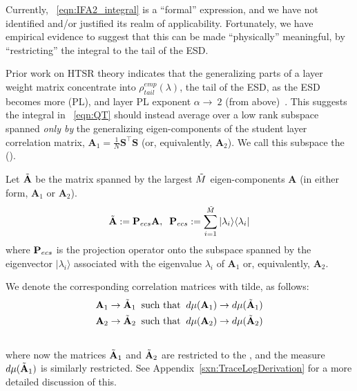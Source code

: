 Currently, \EQN~\ref{eqn:IFA2_integral} is a ``formal'' expression, 
and we have not identified and/or justified its realm of applicability.
Fortunately, we have empirical evidence to suggest that this can be
made ``physically'' meaningful, by ``restricting'' the integral
to the tail of the ESD.

Prior work on HTSR theory indicates that the generalizing parts of a layer weight matrix concentrate
into $\rho_{tail}^{emp}(\lambda)$, the tail of the ESD, as the ESD becomes more \PowerLaw (PL),
and layer PL exponent  $\alpha\rightarrow\ 2$ (from above)~\cite{MM19_HTSR_ICML,MM20_SDM,MM18_TR_JMLRversion,MM20a_trends_NatComm,YTHx23_KDD}. 
This suggests the integral in \EQN~\ref{eqn:QT}
should instead average over a low rank subspace spanned \emph{only by} the generalizing eigen-components of the
student layer correlation matrix, $\mathbf{A}_{1}=\tfrac{1}{N}\mathbf{S}^{\top}\mathbf{S}$
(or, equivalently, $\mathbf{A}_{2}$).
We call this subspace the \EffectiveCorrelationSpace (\ECS).

Let $\tilde{\mathbf{A}}$ be the matrix spanned by the largest $\tilde{M}$ eigen-components $\mathbf{A}$
(in either form, $\mathbf{A}_{1}$ or $\mathbf{A}_{2}$).
\begin{align}
  \label{sqn:AecsDefined}
  \tilde{\mathbf{A}}:=\mathbf{P}_{ecs}\mathbf{A},\;\;  \mathbf{P}_{ecs}:= \sum_{i=1}^{\tilde{M}}|\lambda_{i}\rangle\langle\lambda_{i}|
\end{align}
where $\mathbf{P}_{ecs}$ is the projection operator onto the subspace spanned by the eigenvector
$|\lambda_{i}\rangle$  associated with the eigenvalue $\lambda_{i}$ of $\mathbf{A}_{1}$ or, equivalently, $\mathbf{A}_{2}$.

We denote the corresponding \Student correlation matrices with tilde, as follows:
\begin{align}
  \mathbf{A}_{1} \rightarrow \tilde{\mathbf{A}}_{1}\;\; \text{such that}\;\; d\mu(\mathbf{A}_{1}) \rightarrow d\mu(\tilde{\mathbf{A}}_{1}) \\ \nonumber
  \mathbf{A}_{2} \rightarrow \tilde{\mathbf{A}}_{2}\;\; \text{such that}\;\; d\mu(\mathbf{A}_{2}) \rightarrow d\mu(\tilde{\mathbf{A}}_{2}) \\ \nonumber
\end{align}
where now the matrices $\tilde{\mathbf{A}}_{1}$ and $\tilde{\mathbf{A}}_{2}$ are restricted to the \ECS, and the measure $d\mu(\tilde{\mathbf{A}}_{1})$ is similarly restricted.
 See Appendix~\ref{sxn:TraceLogDerivation} for a more detailed discussion of this.
   
